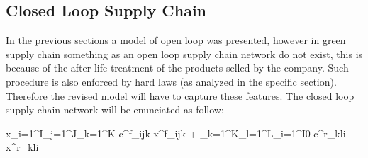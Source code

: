 \documentclass{article}
\begin{document}
\subsection{Closed Loop Supply Chain}
In the previous sections a model of open loop was presented, however in green supply chain something as an open loop supply chain network do not exist, this is because of the after life treatment of the products selled by the company. Such procedure is also enforced by hard laws (as analyzed in the specific section). Therefore the revised model will have to capture these features. The closed loop supply chain network will be enunciated as follow:

\begin{mini!}
	{x}{\sum_{i=1}^{I}\sum_{j=1}^{J}\sum_{k=1}^{K} c^f_{ijk} x^f_{ijk}  + \sum_{k=1}^{K}\sum_{l=1}^{L}\sum_{i=1}^{I0} c^r_{kli} x^r_{kli}}{}{}
\end{mini!}
\end{document}
